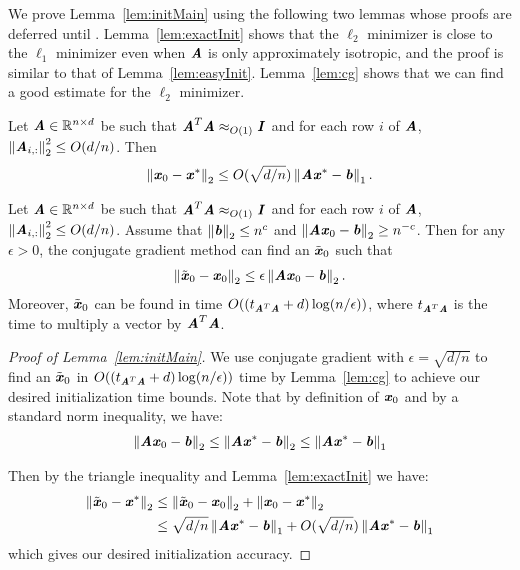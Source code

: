 We prove Lemma~\ref{lem:initMain} using the following two lemmas whose proofs are deferred until . Lemma~\ref{lem:exactInit} shows that the $\ell_2$ minimizer is close to the $\ell_1$ minimizer even when $\AA$ is only approximately isotropic, and the proof is similar to that of Lemma~\ref{lem:easyInit}.
Lemma~\ref{lem:cg} shows that we can find a good estimate for the $\ell_2$ minimizer.

\begin{lemma}\label{lem:exactInit}
	Let $\AA \in \R^{n \times d}$ be such that $\AA^T \AA \approx_{O(1)} \II$ and for each row $i$ of $\AA$, $\norme{\AA_{i,:}}^2 \leq O(d/n)$. Then
	\begin{align*}
	\norme{\xx_0 - \xx^*} \le O(\sqrt{d/n}) \norm{\AA \xx^* - \bb}_1.
	\end{align*}
\end{lemma}

\begin{lemma}\label{lem:cg}
Let $\AA \in \R^{n \times d}$ be such that $\AA^T \AA \approx_{O(1)} \II$ and for each row $i$ of $\AA$, $\norme{\AA_{i,:}}^2 \leq O(d/n)$. Assume that $\norme{\bb} \le n^c$ and $\norme{\AA\xx_0 - \bb} \ge n^{-c}$.
Then for any $\epsilon > 0$, the conjugate gradient method can find an $\tilde{\xx}_0$ such that
\begin{align*}
\norme{\tilde{\xx}_0 - \xx_0} \le \epsilon \norme{\AA\xx_0 - \bb}.
\end{align*}
Moreover, $\tilde{\xx}_0$ can be found in time $O( (t_{\AA^T \AA} + d) \log (n/ \epsilon))$, where $t_{\AA^T \AA}$ is the time to multiply a vector by $\AA^T \AA$. 
\end{lemma}

\begin{proof}[Proof of Lemma~\ref{lem:initMain}]
	We use conjugate gradient with $\epsilon = \sqrt{d/n}$ to find an $\tilde{\xx}_0$ in $O((t_{\AA^T \AA} + d) \log (n/ \epsilon))$ time by Lemma~\ref{lem:cg} to achieve our desired initialization time bounds.
	Note that by definition of $\xx_0$ and by a standard norm inequality, we have:
	\begin{align*}
	\norme{\AA \xx_0 - \bb} \le \norme{\AA \xx^* - \bb} \le \norm{\AA \xx^* - \bb}_1
	\end{align*}
	
	Then by the triangle inequality and Lemma~\ref{lem:exactInit} we have:
	\begin{align*}
	\norme{\tilde{\xx}_0 - \xx^*} &\le \norme{\tilde{\xx}_0 - \xx_0} + \norme{\xx_0 - \xx^*} \\
	&\le \sqrt{d/n}\norm{\AA \xx^* - \bb}_1 + O(\sqrt{d/n})\norm{\AA \xx^* - \bb}_1
	\end{align*}
	which gives our desired initialization accuracy.
\end{proof}

